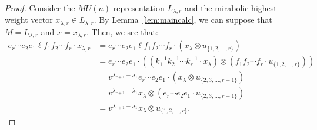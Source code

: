 \documentclass{amsart}
\numberwithin{equation}{section}
\theoremstyle{theorem}
\theoremstyle{definition}
\newcommand{\drcomm}[1]{\textcolor{red}{#1}}
\begin{document}
\begin{proof}
Consider the $MU(n)$-representation $L_{\lambda, r}$ and the mirabolic highest weight vector $x_{\lambda, r}\in L_{\lambda, r}$. By Lemma~\ref{lem:maincalc}, we can suppose that $M=L_{\lambda, r}$ and $x=x_{\lambda, r}$. Then, we see that:
\begin{align*}
e_r\cdots e_2e_1\ell f_1f_2\cdots f_r\cdot x_{\lambda, r} &= e_r\cdots e_2e_1\ell f_1f_2\cdots f_r\cdot (x_{\lambda}\otimes u_{\{1,2,\dots, r\}}) \\
&=e_r\cdots e_2e_1 \cdot((k_1^{-1}k_2^{-1}\cdots k_{r}^{-1}\cdot x_{\lambda})\otimes(f_1f_2\cdots f_{r}\cdot u_{\{1,2,\dots, r\}}))\\
&=v^{\lambda_{r+1}-\lambda_1}e_r\cdots e_2e_1 \cdot( x_{\lambda}\otimes u_{\{2,3,\dots, r+1\}})\\
&=v^{\lambda_{r+1}-\lambda_1} x_{\lambda}\otimes(e_{r}\cdots e_2e_1\cdot u_{\{2,3,\dots, r+1\}})\\
&=v^{\lambda_{r+1}-\lambda_1} x_{\lambda}\otimes u_{\{1,2,\dots, r\}}.
\end{align*}

\end{proof}
\end{document}
